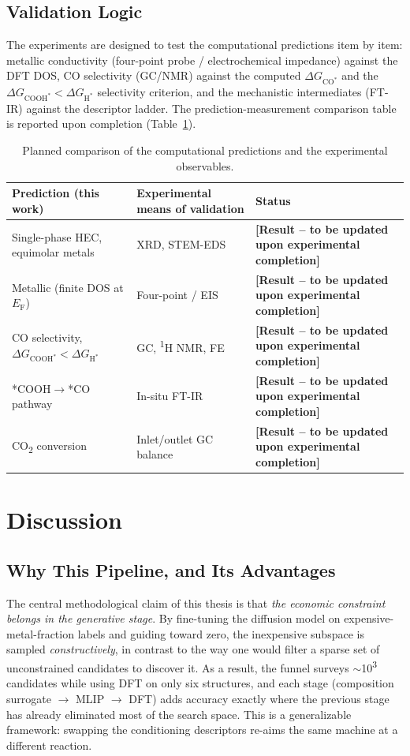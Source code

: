 \documentclass[11pt,a4paper]{report}
\newcommand{\tbu}[1]{\textcolor{red!70!black}{\textbf{[#1 -- to be updated upon experimental completion]}}}
\newcommand{\dGCO}{\Delta G_{\mathrm{CO^*}}}
\newcommand{\dGH}{\Delta G_{\mathrm{H^*}}}
\newcommand{\dGCOOH}{\Delta G_{\mathrm{COOH^*}}}
\newcommand{\Ef}{E_\mathrm{F}}
\begin{document}
\section{Validation Logic}
The experiments are designed to test the computational predictions item by item: metallic conductivity
(four-point probe / electrochemical impedance) against the DFT DOS, CO selectivity (GC/NMR) against the
computed $\dGCO$ and the $\dGCOOH<\dGH$ selectivity criterion, and the mechanistic intermediates (FT-IR)
against the descriptor ladder. The prediction-measurement comparison table is reported upon completion
(Table~\ref{tab:expt}).

\begin{table}[t]
\centering
\caption{Planned comparison of the computational predictions and the experimental observables.}
\label{tab:expt}
\small
\begin{tabular}{p{5cm}p{4.4cm}p{3.1cm}}
\toprule
Prediction (this work) & Experimental means of validation & Status\\
\midrule
Single-phase HEC, equimolar metals & XRD, STEM-EDS & \tbu{Result}\\
Metallic (finite DOS at $\Ef$) & Four-point / EIS & \tbu{Result}\\
CO selectivity, $\dGCOOH<\dGH$ & GC, \textsuperscript{1}H NMR, FE & \tbu{Result}\\
*COOH$\rightarrow$*CO pathway & In-situ FT-IR & \tbu{Result}\\
CO\textsubscript{2} conversion & Inlet/outlet GC balance & \tbu{Result}\\
\bottomrule
\end{tabular}
\end{table}

\chapter{Discussion}
\label{ch:discussion}

\section{Why This Pipeline, and Its Advantages}
The central methodological claim of this thesis is that \emph{the economic constraint belongs in the
generative stage}. By fine-tuning the diffusion model on expensive-metal-fraction labels and guiding toward
zero, the inexpensive subspace is sampled \emph{constructively}, in contrast to the way one would filter a
sparse set of unconstrained candidates to discover it. As a result, the funnel surveys $\sim$10\textsuperscript{3}
candidates while using DFT on only six structures, and each stage (composition surrogate $\rightarrow$ MLIP
$\rightarrow$ DFT) adds accuracy exactly where the previous stage has already eliminated most of the search
space. This is a generalizable framework: swapping the conditioning descriptors re-aims the same machine at a
different reaction.
\end{document}
